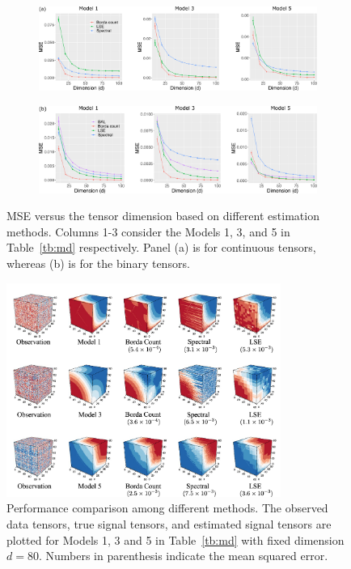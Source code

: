 \documentclass[12pt]{article}
\theoremstyle{definition}
\begin{document}
 


\begin{figure}[t!]
    \centering
    \begin{subfigure}[b]{.85\textwidth}
    \includegraphics[width = \textwidth]{figure/altdim_conti.pdf}
    \vspace{-.6cm}
    \end{subfigure}
    \begin{subfigure}[b]{.85\textwidth}
    \includegraphics[width = \textwidth]{figure/altdim_binary.pdf}   
    \end{subfigure}
    \caption{MSE versus the tensor dimension based on different estimation methods. Columns 1-3 consider the Models 1, 3, and 5 in Table~\ref{tb:md} respectively. Panel (a) is for continuous tensors, whereas (b) is for the binary tensors.}
    \label{fig:method}
\end{figure}


\begin{figure}[t!]
    \centering
    \includegraphics[width =0.8\textwidth]{figure/vfinal.pdf}
    \caption{Performance comparison among different methods. The observed data tensors, true signal tensors, and estimated signal tensors are plotted for Models 1, 3 and 5 in Table~\ref{tb:md} with fixed dimension $d = 80$. Numbers in parenthesis indicate the mean squared error.}
    \label{fig:contim}
\end{figure}
\end{document}
